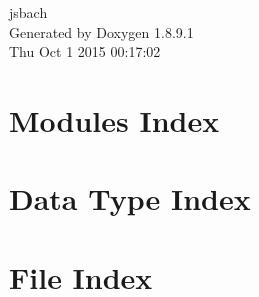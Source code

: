 \documentclass[twoside]{book}
\newcommand{\+}{\discretionary{\mbox{\scriptsize$\hookleftarrow$}}{}{}}
\newcommand{\clearemptydoublepage}{%
  \newpage{\pagestyle{empty}\cleardoublepage}%
}
\begin{document}
\hypersetup{pageanchor=false,
             bookmarks=true,
             bookmarksnumbered=true,
             pdfencoding=unicode
            }
\begin{titlepage}
\vspace*{7cm}
\begin{center}%
{\Large jsbach }\\
\vspace*{1cm}
{\large Generated by Doxygen 1.8.9.1}\\
\vspace*{0.5cm}
{\small Thu Oct 1 2015 00:17:02}\\
\end{center}
\end{titlepage}
\clearemptydoublepage
\tableofcontents
\clearemptydoublepage
{}
\hypersetup{pageanchor=true}

\chapter{Modules Index}

\chapter{Data Type Index}

\chapter{File Index}

\end{document}
